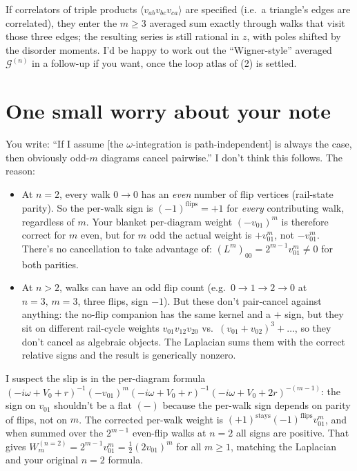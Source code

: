 \documentclass[11pt,a4paper]{article}
\begin{document}
If correlators of triple products $\langle v_{ab}v_{bc}v_{ca}\rangle$ are
specified (i.e.\ a triangle's edges are correlated), they enter the
$m{\geq}3$ averaged sum exactly through walks that visit those three
edges; the resulting series is still rational in $z$, with poles
shifted by the disorder moments. I'd be happy to work out the
``Wigner-style'' averaged $\mathcal G^{(n)}$ in a follow-up if you want,
once the loop atlas of (2) is settled.

\section{One small worry about your note}

You write: ``If I assume [the $\omega$-integration is path-independent]
is always the case, then obviously odd-$m$ diagrams cancel pairwise.''
I don't think this follows. The reason:

\begin{itemize}[leftmargin=2em,itemsep=2pt]
\item At $n{=}2$, every walk $0\!\to\!0$ has an \emph{even} number of
flip vertices (rail-state parity). So the per-walk sign is
$(-1)^{\text{flips}}=+1$ for \emph{every} contributing walk, regardless
of $m$. Your blanket per-diagram weight $(-v_{01})^{m}$ is therefore
correct for $m$ even, but for $m$ odd the actual weight is $+v_{01}^{m}$,
not $-v_{01}^{m}$. There's no cancellation to take advantage of:
$(L^{m})_{00}=2^{m-1}v_{01}^{m}\neq 0$ for both parities.
\item At $n{>}2$, walks can have an odd flip count (e.g.\
$0\!\to\!1\!\to\!2\!\to\!0$ at $n{=}3,\,m{=}3$, three flips, sign $-1$).
But these don't pair-cancel against anything: the no-flip companion has
the same kernel and a $+$ sign, but they sit on different rail-cycle
weights $v_{01}v_{12}v_{20}$ vs.\ $(v_{01}+v_{02})^{3}+\dots$, so they
don't cancel as algebraic objects. The Laplacian sums them with the
correct relative signs and the result is generically nonzero.
\end{itemize}

I suspect the slip is in the per-diagram formula
$(-i\omega+V_{0}+r)^{-1}(-v_{01})^{m}(-i\omega+V_{0}+r)^{-1}(-i\omega+V_{0}+2r)^{-(m-1)}$:
the sign on $v_{01}$ shouldn't be a flat $(-)$ because the per-walk sign
depends on parity of flips, not on $m$. The corrected per-walk weight
is $(+1)^{\text{stays}}(-1)^{\text{flips}}v_{01}^{m}$, and when summed
over the $2^{m-1}$ even-flip walks at $n{=}2$ all signs are positive.
That gives $W^{(n=2)}_{m}=2^{m-1}v_{01}^{m}=\tfrac12(2v_{01})^{m}$ for all
$m\!\geq\!1$, matching the Laplacian and your original $n{=}2$ formula.
\end{document}
